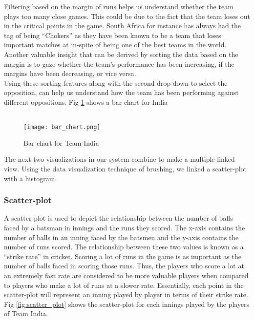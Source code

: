 \documentclass[10pt,journal,compsoc]{IEEEtran}
\begin{document}
\indent Filtering based on the margin of runs helps us understand whether the team plays too many close games. This could be due to the fact that the team loses out in the critical points in the game. South Africa for instance has always had the tag of being ``Chokers'' as they have been known to be a team that loses important matches at in-spite of being one of the best teams in the world.\\

\indent Another valuable insight that can be derived by sorting the data based on the margin is to gaze whether the team's performance has been increasing, if the margins have been decreasing, or vice versa.\\

\indent Using these sorting features along with the second drop down to select the opposition, can help us understand how the team has been performing against different oppositions. Fig \ref{fig:bar_chart} shows a bar chart for India\\ \\ 

\begin{figure}[ht]
\texttt{[image: bar\_chart.png]}
\caption{Bar chart for Team India}
\label{fig:bar_chart}
\end{figure}

The next two visualizations in our system combine to make a multiple linked view. Using the data visualization technique of brushing, we linked a scatter-plot with a histogram.
 
\subsubsection {Scatter-plot}
A scatter-plot is used to depict the relationship between the number of balls faced by a batsman in innings and the runs they scored. The x-axis contains the number of balls in an inning faced by the batsmen and the y-axis contains the number of runs scored. The relationship between these two values is known as a ``strike rate'' in cricket. Scoring a lot of runs in the game is as important as the number of balls faced in scoring those runs. Thus, the players who score a lot at an extremely fast rate are considered to be more valuable players when compared to players who make a lot of runs at a slower rate. Essentially, each point in the scatter-plot will represent an inning played by player in terms of their strike rate. \\ Fig \ref{fig:scatter_plot} shows the scatter-plot for each innings played by the players of Team India.
\end{document}
